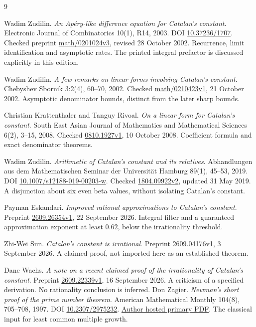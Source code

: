 \renewcommand{\bibname}{Primary sources}
\begin{thebibliography}{9}
Wadim Zudilin.
\emph{An Ap\'ery-like difference equation for Catalan's constant}.
Electronic Journal of Combinatorics 10(1), R14, 2003.
DOI \href{https://doi.org/10.37236/1707}{10.37236/1707}.
Checked preprint \href{https://arxiv.org/abs/math/0201024v3}{math/0201024v3}, revised 28 October 2002.
Recurrence, limit identification and asymptotic rates. The printed integral prefactor is discussed explicitly in this edition.

Wadim Zudilin.
\emph{A few remarks on linear forms involving Catalan's constant}.
Chebyshev Sbornik 3:2(4), 60--70, 2002.
Checked \href{https://arxiv.org/abs/math/0210423v1}{math/0210423v1}, 21 October 2002.
Asymptotic denominator bounds, distinct from the later sharp bounds.

Christian Krattenthaler and Tanguy Rivoal.
\emph{On a linear form for Catalan's constant}.
South East Asian Journal of Mathematics and Mathematical Sciences 6(2), 3--15, 2008.
Checked \href{https://arxiv.org/abs/0810.1927v1}{0810.1927v1}, 10 October 2008.
Coefficient formula and exact denominator theorems.

Wadim Zudilin.
\emph{Arithmetic of Catalan's constant and its relatives}.
Abhandlungen aus dem Mathematischen Seminar der Universit\"at Hamburg 89(1), 45--53, 2019.
DOI \href{https://doi.org/10.1007/s12188-019-00203-w}{10.1007/s12188-019-00203-w}.
Checked \href{https://arxiv.org/abs/1804.09922v2}{1804.09922v2}, updated 31 May 2019.
A disjunction about six even beta values, without isolating Catalan's constant.

Payman Eskandari.
\emph{Improved rational approximations to Catalan's constant}.
Preprint \href{https://arxiv.org/abs/2609.26354v1}{2609.26354v1}, 22 September 2026.
Integral filter and a guaranteed approximation exponent at least $0.62$, below the irrationality threshold.

Zhi-Wei Sun.
\emph{Catalan's constant is irrational}.
Preprint \href{https://arxiv.org/abs/2609.04176v1}{2609.04176v1}, 3 September 2026.
A claimed proof, not imported here as an established theorem.

Dane Wachs.
\emph{A note on a recent claimed proof of the irrationality of Catalan's constant}.
Preprint \href{https://arxiv.org/abs/2609.22339v1}{2609.22339v1}, 16 September 2026.
A criticism of a specified derivation. No rationality conclusion is inferred.
Don Zagier.
\emph{Newman's short proof of the prime number theorem}.
American Mathematical Monthly 104(8), 705--708, 1997.
DOI \href{https://doi.org/10.2307/2975232}{10.2307/2975232}.
\href{https://people.mpim-bonn.mpg.de/zagier/files/doi/10.2307/2975232/fulltext.pdf}{Author hosted primary PDF}.
The classical input for least common multiple growth.

\end{thebibliography}
